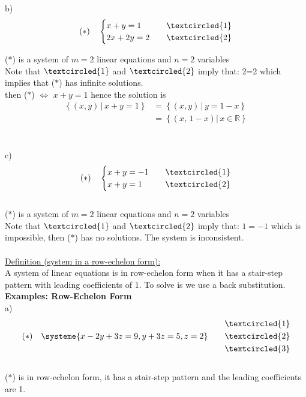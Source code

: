 \documentclass{jhwhw}
\begin{document}
b)  \begin{align*} 
    (\ast) \quad \begin{cases} 
    x+y=1 & \quad \textcircled{1} \\ 2x+2y=2 & \quad \textcircled{2}  
\end{cases}
\end{align*}

(\(\ast\)) is a system of \(m=2\) linear equations and \(n=2\) variables \\
Note that \(\textcircled{1}\) and \(\textcircled{2}\) imply that: 2=2 which implies that (\(\ast\)) has infinite solutions.\\
then (\(\ast\)) \(\Leftrightarrow\) \(x+y=1\) hence the solution is
\begin{align*} 
\left\{(x,y) \,|\, x+y=1 \right\} &= \left\{ (x,y) \, | \, y=1-x \right\} \\
&= \left\{(x, \, 1-x) | \, x \in \mathbb{R} \right\}
\end{align*}
\\ \\
c) \begin{align*} 
(\ast) \quad \begin{cases} x+y=-1 & \quad \textcircled{1} \\ x+y=1 & \quad \textcircled{2} \end{cases}
\end{align*}
\\
(\(\ast\)) is a system of \(m=2\) linear equations and \(n=2\) variables\\
Note that \(\textcircled{1}\) and \(\textcircled{2}\) imply that: \(1=-1\) which is impossible, then (\(\ast\)) has no solutions. The system is inconsistent.
\\ \\

\underline{Definition (system in a row-echelon form):}
\\ 

A system of linear equations is in row-echelon form when it has a stair-step pattern with leading coefficients of 1. To solve is we use a back substitution.
\\

\textbf{Examples: Row-Echelon Form}
\\

a) \begin{align*} 
(\ast) \quad \systeme{x-2y+3z=9,y+3z=5,z=2} \quad \quad \begin{aligned} &\textcircled{1} \\ &\textcircled{2} \\ &\textcircled{3} \end{aligned}
\end{align*}
\\
(\(\ast\)) is in row-echelon form, it has a stair-step pattern and the leading coefficients are 1.
\\ \\
\end{document}
